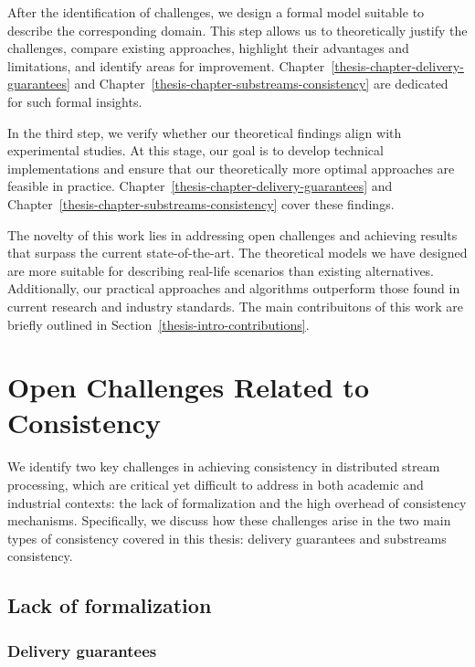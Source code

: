After the identification of challenges, we design a formal model suitable to describe the corresponding domain. This step allows us to theoretically justify the challenges, compare existing approaches, highlight their advantages and limitations, and identify areas for improvement. Chapter~\ref{thesis-chapter-delivery-guarantees} and Chapter~\ref{thesis-chapter-substreams-consistency} are dedicated for such formal insights.

In the third step, we verify whether our theoretical findings align with experimental studies. At this stage, our goal is to develop technical implementations and ensure that our theoretically more optimal approaches are feasible in practice. Chapter~\ref{thesis-chapter-delivery-guarantees} and Chapter~\ref{thesis-chapter-substreams-consistency} cover these findings.

The novelty of this work lies in addressing open challenges and achieving results that surpass the current state-of-the-art. The theoretical models we have designed are more suitable for describing real-life scenarios than existing alternatives. Additionally, our practical approaches and algorithms outperform those found in current research and industry standards. The main contribuitons of this work are briefly outlined in Section~\ref{thesis-intro-contributions}.

\section{Open Challenges Related to Consistency}
\label{thesis-intro-challenges}

We identify two key challenges in achieving consistency in distributed stream processing, which are critical yet difficult to address in both academic and industrial contexts: the lack of formalization and the high overhead of consistency mechanisms. Specifically, we discuss how these challenges arise in the two main types of consistency covered in this thesis: delivery guarantees and substreams consistency.

\subsection{Lack of formalization}

\subsubsection{Delivery guarantees}

